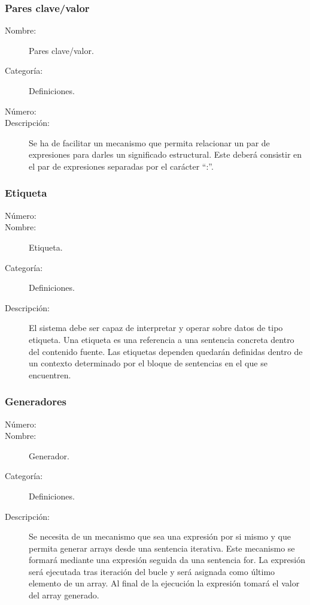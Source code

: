 \subsubsection{Pares clave/valor}
\begin{framed}
	\begin{description}
		\item [Nombre:] Pares clave/valor.
		\item [Categoría:] Definiciones.
		\item [Número:] \cn
		\item [Descripción:] Se ha de facilitar un mecanismo que permita relacionar un par de expresiones para darles un significado estructural.
		Este deberá consistir en el par de expresiones separadas por el carácter ``:''.
	\end {description}
\end{framed}

\subsubsection{Etiqueta}
\begin{framed}
	\begin{description}
		\item [Número:] \cn
		\item [Nombre:] Etiqueta.
		\item [Categoría:] Definiciones.
		\item [Descripción:] El sistema debe ser capaz de interpretar y operar sobre datos de tipo etiqueta. Una etiqueta es una referencia
		a una sentencia concreta dentro del contenido fuente. Las etiquetas dependen quedarán definidas dentro de un contexto determinado por
		el bloque de sentencias en el que se encuentren.
	\end {description}
\end{framed}

\subsubsection{Generadores}
\begin{framed}
	\begin{description}
		\item [Número:] \cn
		\item [Nombre:] Generador.
		\item [Categoría:] Definiciones.
		\item [Descripción:] Se necesita de un mecanismo que sea una expresión por si mismo y que permita generar arrays desde una sentencia iterativa. 
		Este mecanismo se formará mediante una expresión seguida da una sentencia for. La expresión será ejecutada tras iteración del bucle y será 
		asignada como último elemento de un array. Al final de la ejecución la expresión tomará el valor del array generado.
	\end{description}
\end{framed}
